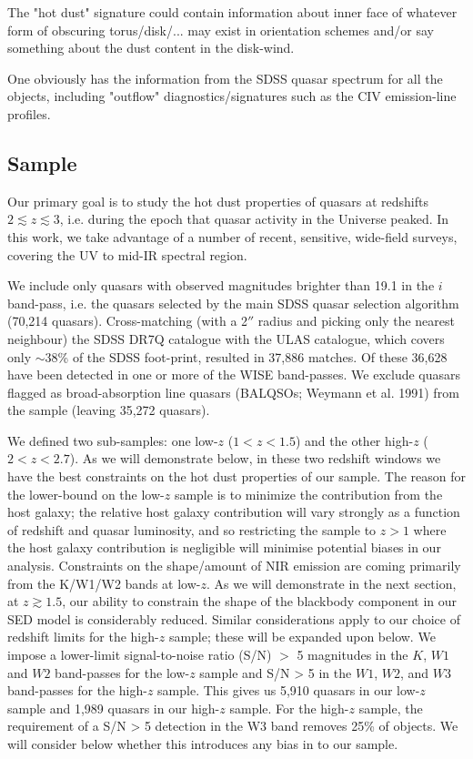 The "hot dust" signature could contain information about inner face of whatever form of obscuring torus/disk/... may exist in orientation schemes and/or say something about the dust content in the disk-wind.

One obviously has the information from the SDSS quasar spectrum for all the objects, including "outflow" diagnostics/signatures such as the CIV emission-line profiles.

\subsection{Sample}

Our primary goal is to study the hot dust properties of quasars at redshifts $2 \lesssim z \lesssim 3$, i.e. during the epoch that quasar activity in the Universe peaked. 
In this work, we take advantage of a number of recent, sensitive, wide-field surveys, covering the UV to mid-IR spectral region. 

We include only quasars with observed magnitudes brighter than 19.1 in the $i$ band-pass, i.e. the quasars selected by the main SDSS quasar selection algorithm (70,214 quasars). 
Cross-matching (with a 2$''$ radius and picking only the nearest neighbour) the SDSS DR7Q catalogue with the ULAS catalogue, which covers only $\sim 38$\% of the SDSS foot-print, resulted in 37,886 matches. 
Of these 36,628 have been detected in one or more of the WISE band-passes. 
We exclude quasars flagged as broad-absorption line quasars (BALQSOs; Weymann et al. 1991) from the sample (leaving 35,272 quasars).

We defined two sub-samples: one low-$z$ ($1 < z < 1.5$) and the other high-$z$ ($2 < z < 2.7$). 
As we will demonstrate below, in these two redshift windows we have the best constraints on the hot dust properties of our sample. 
The reason for the lower-bound on the low-$z$ sample is to minimize the contribution from the host galaxy; the relative host galaxy contribution will vary strongly as a function of redshift and quasar luminosity, and so restricting the sample to $z>1$ where the host galaxy contribution is negligible will minimise potential biases in our analysis. 
Constraints on the shape/amount of NIR emission are coming primarily from the K/W1/W2 bands at low-$z$. 
As we will demonstrate in the next section, at $z \gtrsim 1.5$, our ability to constrain the shape of the blackbody component in our SED model is considerably reduced. 
Similar considerations apply to our choice of redshift limits for the high-$z$ sample; these will be expanded upon below. 
We impose a lower-limit signal-to-noise ratio (S/N) $>$ 5 magnitudes in the $K$, $W1$ and $W2$ band-passes for the low-$z$ sample and S/N > 5 in the $W1$, $W2$, and $W3$ band-passes for the high-$z$ sample. 
This gives us 5,910 quasars in our low-$z$ sample and 1,989 quasars in our high-$z$ sample. 
For the high-$z$ sample, the requirement of a S/N > 5 detection in the W3 band removes 25\% of objects. 
We will consider below whether this introduces any bias in to our sample. 

